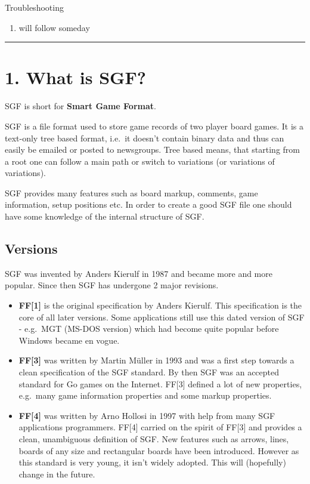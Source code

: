 Troubleshooting

\begin{enumerate}
\def\labelenumi{\arabic{enumi}.}
\setcounter{enumi}{8}
\tightlist
\item
  will follow someday
\end{enumerate}

\begin{center}\rule{0.5\linewidth}{0.5pt}\end{center}

\section{1. What is SGF?}\label{what-is-sgf}

SGF is short for \textbf{Smart Game Format}.

SGF is a file format used to store game records of two player board
games. It is a text-only tree based format, i.e.~it doesn't contain
binary data and thus can easily be emailed or posted to newsgroups. Tree
based means, that starting from a root one can follow a main path or
switch to variations (or variations of variations).

SGF provides many features such as board markup, comments, game
information, setup positions etc. In order to create a good SGF file one
should have some knowledge of the internal structure of SGF.

\subsection{Versions}\label{versions}

SGF was invented by Anders Kierulf in 1987 and became more and more
popular. Since then SGF has undergone 2 major revisions.

\begin{itemize}
\item
  \textbf{FF{[}1{]}} is the original specification by Anders Kierulf.
  This specification is the core of all later versions. Some
  applications still use this dated version of SGF - e.g.~MGT (MS-DOS
  version) which had become quite popular before Windows became en
  vogue.
\item
  \textbf{FF{[}3{]}} was written by Martin Müller in 1993 and was a
  first step towards a clean specification of the SGF standard. By then
  SGF was an accepted standard for Go games on the Internet. FF{[}3{]}
  defined a lot of new properties, e.g.~many game information properties
  and some markup properties.
\item
  \textbf{FF{[}4{]}} was written by Arno Hollosi in 1997 with help from
  many SGF applications programmers. FF{[}4{]} carried on the spirit of
  FF{[}3{]} and provides a clean, unambiguous definition of SGF. New
  features such as arrows, lines, boards of any size and rectangular
  boards have been introduced. However as this standard is very young,
  it isn't widely adopted. This will (hopefully) change in the future.
\end{itemize}

